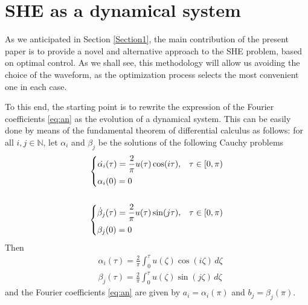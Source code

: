 \section{SHE as a dynamical system}\label{Section3}

As we anticipated in Section \ref{Section1}, the main contribution of the present paper is to provide a novel and alternative approach to the SHE problem, based on optimal control. As we shall see, this methodology will allow us avoiding the choice of the waveform, as the optimization process selects the most convenient one in each case. 

To this end, the starting point is to rewrite the expression of the Fourier coefficients \eqref{eq:an} as the evolution of a dynamical system. This can be easily done by means of the fundamental theorem of differential calculus as follows: for all $i,j\in\mathbb{N}$, let $\alpha_i$ and $\beta_j$ be the solutions of the following Cauchy problems
\begin{align}\label{eq:Cauchy}
	\begin{cases} 
		\displaystyle\dot{\alpha_i}(\tau)  = \frac{2}{\pi}u(\tau)\cos(i\tau), & \tau\in [0,\pi) 
		\\[6pt]  
		\alpha_i(0)  = 0       
	\end{cases} \notag 
	\\
	\\
	\begin{cases} 
		\displaystyle\dot{\beta}_j(\tau)  = \frac{2}{\pi}u(\tau)\sin(j\tau), & \tau\in [0,\pi) 
		\\[6pt]  
		\beta_j(0) = 0       
	\end{cases}\notag
\end{align}
Then 
\begin{align*}
	&\alpha_i(\tau)= \frac{2}{\pi}\int_0^\tau u(\zeta) \cos(i\zeta)\,d\zeta 
	\\[5pt]
	&\beta_j(\tau) = \frac{2}{\pi}\int_0^\tau u(\zeta) \sin(j\zeta)\,d\zeta 
\end{align*}
and the Fourier coefficients \eqref{eq:an} are given by $a_i=\alpha_i(\pi)$ and $b_j=\beta_j(\pi)$.  

